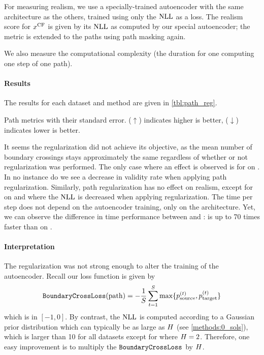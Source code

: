 \documentclass[../main.tex]{subfiles}
\begin{document}
For measuring realism, we use a specially-trained autoencoder with the same architecture as the others, trained using only the $\text{NLL}$ as a loss.
The realism score for $x^\mathrm{CF}$ is given by its $\text{NLL}$ as computed by our special autoencoder;
the metric is extended to the paths using path masking again.

We also measure the computational complexity (the duration for one computing one step of one path).

\paragraph{Results}

The results for each dataset and method are given in \autoref{tbl:path_reg}.

\begin{table}[h!]
    \centering
    
    \caption{Path metrics with their standard error. ($\uparrow$) indicates higher is better, ($\downarrow$) indicates lower is better.}
    \label{tbl:path_reg}
\end{table}

It seems the regularization did not achieve its objective, as the mean number of boundary crossings stays approximately the same regardless of whether or not regularization was performed.
The only case where an effect is observed is for \revise{} on \CakeOnSea{}.
In no instance do we see a decrease in validity rate when applying path regularization.
Similarly, path regularization has no effect on realism, except for \ls{} on \CakeOnSea{} and \ForestCover{} where the $\text{NLL}$ is decreased when applying regularization.
The time per step does not depend on the autoencoder training, only on the architecture.
Yet, we can observe the difference in time performance between \ls{} and \revise{}: \ls{} is up to 70 times faster than \revise{} on \OnlineNewsPopularity{}.

\paragraph{Interpretation}

The regularization was not strong enough to alter the training of the autoencoder.
Recall our loss function is given by
\begin{align*}
    \mathtt{BoundaryCrossLoss}(\mathrm{path}) =
    - \frac{1}{S} \sum_{t=1}^{S}
    \max \{ p^{(t)}_{\mathrm{source}}, p^{(t)}_{\mathrm{target}} \}
\end{align*}
which is in $[-1, 0]$.
By contrast, the $\text{NLL}$ is computed according to a Gaussian prior distribution which can typically be as large as $H$ (see \autoref{methods:0_sols}), which is larger than 10 for all datasets except for \CakeOnSea{} where $H=2$.
Therefore, one easy improvement is to multiply the $\mathtt{BoundaryCrossLoss}$ by $H$.
\end{document}
